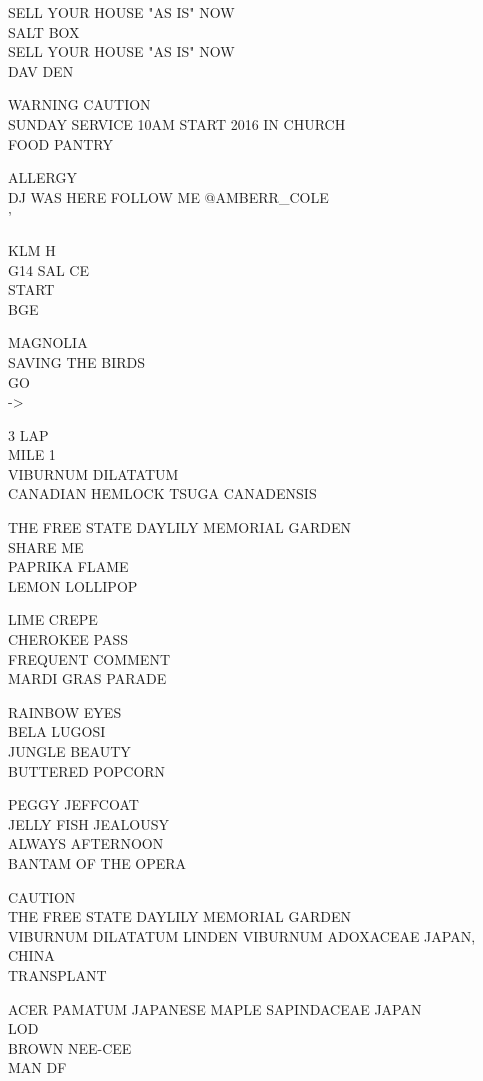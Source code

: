 \documentclass[10pt,letterpaper]{article}
\begin{document}
SELL YOUR HOUSE "AS IS" NOW\\
SALT BOX\\
SELL YOUR HOUSE "AS IS" NOW\\
DAV DEN

WARNING CAUTION\\
SUNDAY SERVICE 10AM START 2016 IN CHURCH\\
FOOD PANTRY

ALLERGY\\
DJ WAS HERE FOLLOW ME @AMBERR\_COLE\\
'

KLM H\\
G14 SAL CE\\
START\\
BGE

MAGNOLIA\\
SAVING THE BIRDS\\
GO\\
{-}>

3 LAP\\
MILE 1\\
VIBURNUM DILATATUM\\
CANADIAN HEMLOCK TSUGA CANADENSIS

THE FREE STATE DAYLILY MEMORIAL GARDEN\\
SHARE ME\\
PAPRIKA FLAME\\
LEMON LOLLIPOP

LIME CREPE\\
CHEROKEE PASS\\
FREQUENT COMMENT\\
MARDI GRAS PARADE

RAINBOW EYES\\
BELA LUGOSI\\
JUNGLE BEAUTY\\
BUTTERED POPCORN

PEGGY JEFFCOAT\\
JELLY FISH JEALOUSY\\
ALWAYS AFTERNOON\\
BANTAM OF THE OPERA

CAUTION\\
THE FREE STATE DAYLILY MEMORIAL GARDEN\\
VIBURNUM DILATATUM LINDEN VIBURNUM ADOXACEAE JAPAN, CHINA\\
TRANSPLANT

ACER PAMATUM JAPANESE MAPLE SAPINDACEAE JAPAN\\
LOD\\
BROWN NEE{-}CEE\\
MAN DF
\end{document}
